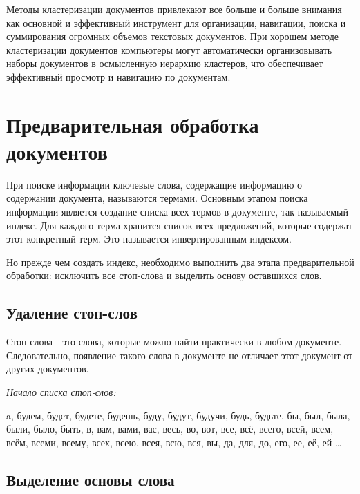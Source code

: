 Методы кластеризации документов привлекают все больше и больше внимания
как основной и эффективный инструмент для организации, навигации, поиска и суммирования огромных объемов текстовых документов.
При хорошем методе кластеризации документов компьютеры могут автоматически организовывать наборы документов в осмысленную иерархию кластеров,
что обеспечивает эффективный просмотр и навигацию по документам.





\newpage





\section{Предварительная обработка документов}

При поиске информации ключевые слова,
содержащие информацию о содержании документа, называются термами.
Основным этапом поиска информации является создание списка всех термов в документе, так называемый индекс.
Для каждого терма хранится список всех предложений, которые содержат этот конкретный терм.
Это называется инвертированным индексом.

Но прежде чем создать индекс, необходимо выполнить два этапа предварительной обработки: исключить все стоп-слова и выделить основу оставшихся слов.



\subsection{Удаление стоп-слов}

Стоп-слова - это слова, которые можно найти практически в любом документе.
Следовательно, появление такого слова в документе не отличает этот документ от других документов.

\textit{Начало списка стоп-слов:}

a, будем, будет, будете, будешь, буду, будут, будучи, будь, будьте, бы,
был, была, были, было, быть, в, вам, вами, вас, весь, во, вот, все, всё,
всего, всей, всем, всём, всеми, всему, всех, всею, всея, всю, вся, вы,
да, для, до, его, ее, её, ей \ldots



\subsection{Выделение основы слова}

